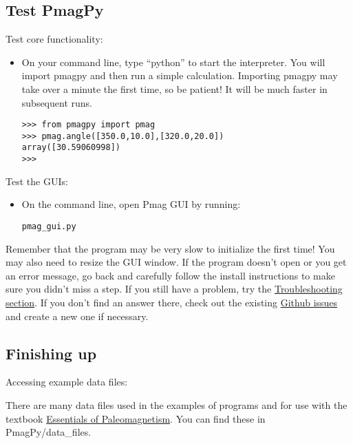 \documentclass[11pt]{article}
\begin{document}
\subsection{Test PmagPy}

Test core functionality:

\begin{itemize}
  \item On your command line, type ``python'' to start the interpreter.  You will import pmagpy and then run a simple calculation.  Importing pmagpy may take over a minute the first time, so be patient!  It will be much faster in subsequent runs.

\begin{verbatim}
>>> from pmagpy import pmag
>>> pmag.angle([350.0,10.0],[320.0,20.0])
array([30.59060998])
>>>
\end{verbatim}

\end{itemize}

Test the GUIs:

\begin{itemize}
\item  On the command line, open Pmag GUI by running:

\begin{verbatim}
pmag_gui.py
\end{verbatim}

\end{itemize}

Remember that the program may be very slow to initialize the first time!  You may also need to resize the GUI window.  If the program doesn't open or you get an error message, go back and carefully follow the install instructions to make sure you didn't miss a step.  If you still have a problem, try the \href{https://earthref.org/PmagPy/cookbook/#trouble}{Troubleshooting section}.  If you don't find an answer there, check out the existing \href{https://github.com/PmagPy/PmagPy/issues}{Github issues} and create a new one if necessary.

\subsection{Finishing up}

Accessing example data files:

   There are many data files used in the examples of programs and for use with the textbook  \href{http://earthref.org/MAGIC/books/Tauxe/Essentials/WebBook3.html}{Essentials of Paleomagnetism}.  You can find these in PmagPy/data_files.
\end{document}
